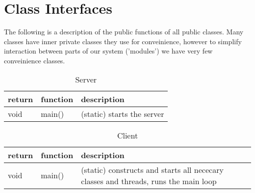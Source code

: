 \section{Class Interfaces}
The following is a description of the public functions of all public classes.
Many classes have inner private classes they use for conveinience, however to
simplify interaction between parts of our system ('modules') we have very few
conveinience classes.


\begin{table}[h]
    \centering
    \begin{tabular}{p{1cm}p{1cm}p{3cm}}
    return & function & description\\ \hline
    void   & main() & (static) starts the server\\
    \end{tabular}
    \caption{Server}
\end{table}

\begin{table}[h]
    \centering
    \begin{tabular}{p{1cm}p{1cm}p{9cm}}
    return & function & description\\ \hline
    void   & main()   & (static) constructs and starts all nececary classes and threads, runs the main loop\\
    \end{tabular}
    \caption{Client}
\end{table}

